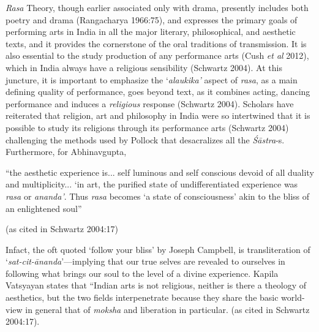 \textsl{Rasa} Theory, though earlier associated only with drama, presently includes both poetry and drama (Rangacharya 1966:75), and expresses the primary goals of performing arts in India in all the major literary, philosophical, and aesthetic texts, and it provides the cornerstone of the oral traditions of transmission. It is also essential to the study production of any performance arts (Cush \textsl{et al} 2012), which in India always have a religious sensibility (Schwartz 2004). At this juncture, it is important to emphasize the ‘\textsl{alaukika’} aspect of \textsl{rasa}, as a main defining quality of performance, goes beyond text, as it combines acting, dancing performance and induces a \textsl{religious} response (Schwartz 2004). Scholars have reiterated that religion, art and philosophy in India were so intertwined that it is possible to study its religions through its performance arts (Schwartz 2004) challenging the methods used by Pollock that desacralizes all the \textsl{Śāstra}-s. Furthermore, for Abhinavgupta, 

\begin{myquote}
“the aesthetic experience is... self luminous and self conscious devoid of all duality and multiplicity... ‘in art, the purified state of undifferentiated experience was \textsl{rasa} or \textsl{ananda’}. Thus \textsl{rasa} becomes ‘a state of consciousness’ akin to the bliss of an enlightened soul” 

\hfill (as cited in Schwartz 2004:17)
\end{myquote}

Infact, the oft quoted ‘follow your bliss’ by Joseph Campbell, is transliteration of ‘\textsl{sat-cit-ānanda}’---implying that our true selves are revealed to ourselves in following what brings our soul to the level of a divine experience. Kapila Vatsyayan states that “Indian arts is not religious, neither is there a theology of aesthetics, but the two fields interpenetrate because they share the basic world-view in general that of \textsl{moksha} and liberation in particular. (as cited in Schwartz 2004:17). 

